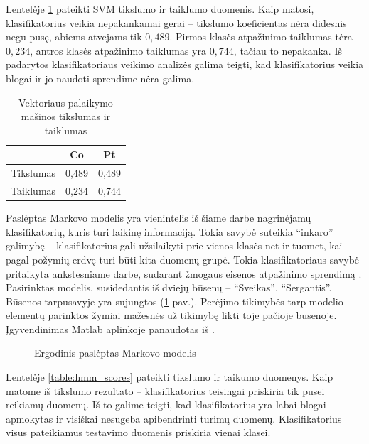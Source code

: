 \documentclass[]{vgtuef}
\begin{document}
Lentelėje \ref{table:svm_scores} pateikti SVM tikslumo ir taiklumo duomenis. Kaip matosi, klasifikatorius veikia nepakankamai gerai -- tikslumo koeficientas nėra didesnis negu pusę, abiems atvejams tik $0,489$. Pirmos klasės atpažinimo taiklumas tėra $0,234$, antros klasės atpažinimo taiklumas yra $0,744$, tačiau to nepakanka. Iš padarytos klasifikatoriaus veikimo analizės galima teigti, kad klasifikatorius veikia blogai ir jo naudoti sprendime nėra galima.

\begin{table}[!t]
  \centering
  \renewcommand{\arraystretch}{1.3}
  \caption{Vektoriaus palaikymo mašinos tikslumas ir taiklumas}
  \label{table:svm_scores}
  \begin{tabular}{|c|c|c|} \hline
    & Co & Pt \\ \hline
    Tikslumas & 0,489 & 0,489 \\ \hline
    Taiklumas & 0,234 & 0,744 \\ \hline
  \end{tabular}
\end{table}

Paslėptas Markovo modelis \cite{18626} yra vienintelis iš šiame darbe nagrinėjamų klasifikatorių, kuris turi laikinę informaciją. Tokia savybė suteikia ``inkaro'' galimybę -- klasifikatorius gali užsilaikyti prie vienos klasės net ir tuomet, kai pagal požymių erdvę turi būti kita duomenų grupė. Tokia klasifikatoriaus savybė pritaikyta ankstesniame darbe, sudarant žmogaus eisenos atpažinimo sprendimą \cite{mano_darbas}. Pasirinktas modelis, susidedantis iš dviejų būsenų -- ``Sveikas'', ``Sergantis''. Būsenos tarpusavyje yra sujungtos (\ref{fig:hmm_model} pav.). Perėjimo tikimybės tarp modelio elementų parinktos žymiai mažesnės už tikimybę likti toje pačioje būsenoje. Įgyvendinimas Matlab aplinkoje panaudotas iš \cite{website:hmm_implementation}.

\begin{figure}
	\centering
	
	\caption{Ergodinis paslėptas Markovo modelis}
	\label{fig:hmm_model}
\end{figure}

Lentelėje \ref{table:hmm_scores} pateikti tikslumo ir taikumo duomenys. Kaip matome iš tikslumo rezultato -- klasifikatorius teisingai priskiria tik pusei reikiamų duomenų. Iš to galime teigti, kad klasifikatorius yra labai blogai apmokytas ir visiškai nesugeba apibendrinti turimų duomenų. Klasifikatorius visus pateikiamus testavimo duomenis priskiria vienai klasei.
\end{document}
